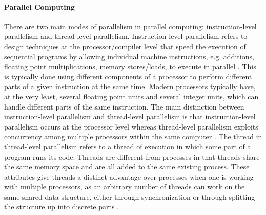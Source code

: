 \paragraph{Parallel Computing}
There are two main modes of parallelism in parallel computing: instruction-level parallelism and thread-level parallelism. Instruction-level parallelism refers to design techniques at the processor/compiler level that speed the execution of sequential programs by allowing individual machine instructions, e.g. additions, floating point multiplications, memory stores/loads, to execute in parallel \cite{ilp_history}. This is typically done using different components of a processor to perform different parts of a given instruction at the same time. Modern processors typically have, at the very least, several floating point units and several integer units, which can handle different parts of the same instruction. The main distinction between instruction-level parallelism and thread-level parallelism is that instruction-level parallelism occurs at the processor level whereas thread-level parallelism exploits concurrency among multiple processors within the same computer \cite{hpc_openstax}.  The thread in thread-level parallelism refers to a thread of execution in which some part of a program runs its code. Threads are different from processes in that threads share the same memory space and are all added to the same existing process. These attributes give threads a distinct advantage over processes when one is working with multiple processors, as an arbitrary number of threads can work on the same shared data structure, either through synchronization or through splitting the structure up into discrete parts \cite{hpc_openstax}. 



